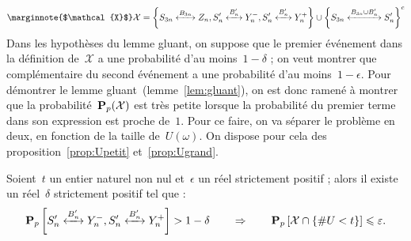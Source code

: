 			\[ 	\marginnote{$\mathcal{X}$}
				\mathcal{X} =
				\left\{
					\relie[B_{3n}]{S_{3n}}{Z_n},
					\relie[B_n']{S_n'}{Y_n^-},
					\relie[B_n']{S_n'}{Y_n^+}
				\right\}
				\cup
				\left\{
					\relie[B_{3n}\cup B_n']{S_{3n}}{S_n'}
				\right\}^c
			\]
			Dans les hypothèses du lemme gluant, on suppose que le premier événement dans la définition de~$\mathcal{X}$ a une probabilité d'au moins~$1-\delta$ ; on veut montrer que complémentaire du second événement a une probabilité d'au moins~$1-\epsilon$. Pour démontrer le lemme gluant~(lemme~\ref{lem:gluant}), on est donc ramené à montrer que la probabilité~$\bm{\mathrm{P}}_{p}(\mathcal{X})$ est très petite lorsque la probabilité du premier terme dans son expression %
			est proche de~$1$. Pour ce faire, on va séparer le problème en deux, en fonction de la taille de~$U(\omega)$. On dispose pour cela des proposition~\ref{prop:Upetit} et~\ref{prop:Ugrand}.
			\begin{prop}\label{prop:Upetit}
				Soient~$t$ un entier naturel non nul et~$\epsilon$ un réel strictement positif ; alors il existe un réel~$\delta$ strictement positif tel que :
				\[
					\Pp{\relie[B_n']{S_n'}{Y_n^-}, \relie[B_n']{S_n'}{Y_n^+}} > 1 - \delta
						\quad\quad
						\Rightarrow
						\quad\quad
					\Pp{\mathcal{X}\cap\{\#U<t\}} \leq \epsilon.
				\]
			\end{prop}
